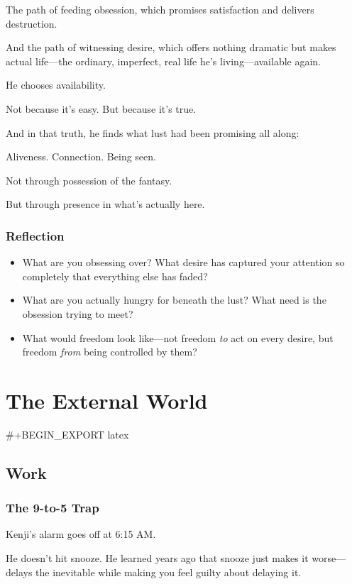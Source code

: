 \documentclass[11pt,twoside]{book}
\renewcommand{\thepart}{}
\let\oldpart\part
\renewcommand{\part}[1]{\oldpart{#1}\renewcommand{\thepart}{\relax}}
\begin{document}
The path of feeding obsession, which promises satisfaction and delivers destruction.

And the path of witnessing desire, which offers nothing dramatic but makes actual life—the ordinary, imperfect, real life he's living—available again.

He chooses availability.

Not because it's easy. But because it's true.

And in that truth, he finds what lust had been promising all along:

Aliveness. Connection. Being seen.

Not through possession of the fantasy.

But through presence in what's actually here.

\section*{Reflection}

\begin{itemize}
\item What are you obsessing over? What desire has captured your attention so completely that everything else has faded?
\item What are you actually hungry for beneath the lust? What need is the obsession trying to meet?
\item What would freedom look like—not freedom \emph{to} act on every desire, but freedom \emph{from} being controlled by them?
\end{itemize}

\part{The External World}

#+BEGIN_EXPORT latex
\chapter{Work}

\section*{The 9-to-5 Trap}

Kenji's alarm goes off at 6:15 AM.

He doesn't hit snooze. He learned years ago that snooze just makes it worse—delays the inevitable while making you feel guilty about delaying it.
\end{document}
